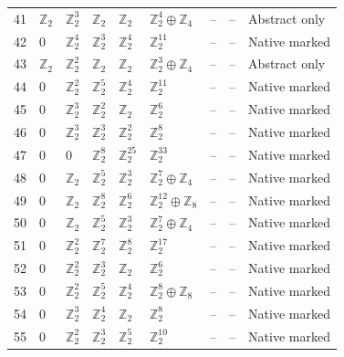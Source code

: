 \documentclass[10pt]{article}
\begin{document}
\begin{longtable}{r|lllll|rrl}
41 & $\mathbb{Z}_{2}$ & $\mathbb{Z}_{2}^{3}$ & $\mathbb{Z}_{2}$ & $\mathbb{Z}_{2}$ & $\mathbb{Z}_{2}^{4}\oplus \mathbb{Z}_{4}$ & -- & -- & Abstract only\\
42 & $0$ & $\mathbb{Z}_{2}^{4}$ & $\mathbb{Z}_{2}^{3}$ & $\mathbb{Z}_{2}^{4}$ & $\mathbb{Z}_{2}^{11}$ & -- & -- & Native marked\\
43 & $\mathbb{Z}_{2}$ & $\mathbb{Z}_{2}^{2}$ & $\mathbb{Z}_{2}$ & $\mathbb{Z}_{2}$ & $\mathbb{Z}_{2}^{3}\oplus \mathbb{Z}_{4}$ & -- & -- & Abstract only\\
44 & $0$ & $\mathbb{Z}_{2}^{2}$ & $\mathbb{Z}_{2}^{5}$ & $\mathbb{Z}_{2}^{4}$ & $\mathbb{Z}_{2}^{11}$ & -- & -- & Native marked\\
45 & $0$ & $\mathbb{Z}_{2}^{3}$ & $\mathbb{Z}_{2}^{2}$ & $\mathbb{Z}_{2}$ & $\mathbb{Z}_{2}^{6}$ & -- & -- & Native marked\\
46 & $0$ & $\mathbb{Z}_{2}^{3}$ & $\mathbb{Z}_{2}^{3}$ & $\mathbb{Z}_{2}^{2}$ & $\mathbb{Z}_{2}^{8}$ & -- & -- & Native marked\\
47 & $0$ & $0$ & $\mathbb{Z}_{2}^{8}$ & $\mathbb{Z}_{2}^{25}$ & $\mathbb{Z}_{2}^{33}$ & -- & -- & Native marked\\
48 & $0$ & $\mathbb{Z}_{2}$ & $\mathbb{Z}_{2}^{5}$ & $\mathbb{Z}_{2}^{3}$ & $\mathbb{Z}_{2}^{7}\oplus \mathbb{Z}_{4}$ & -- & -- & Native marked\\
49 & $0$ & $\mathbb{Z}_{2}$ & $\mathbb{Z}_{2}^{8}$ & $\mathbb{Z}_{2}^{6}$ & $\mathbb{Z}_{2}^{12}\oplus \mathbb{Z}_{8}$ & -- & -- & Native marked\\
50 & $0$ & $\mathbb{Z}_{2}$ & $\mathbb{Z}_{2}^{5}$ & $\mathbb{Z}_{2}^{3}$ & $\mathbb{Z}_{2}^{7}\oplus \mathbb{Z}_{4}$ & -- & -- & Native marked\\
51 & $0$ & $\mathbb{Z}_{2}^{2}$ & $\mathbb{Z}_{2}^{7}$ & $\mathbb{Z}_{2}^{8}$ & $\mathbb{Z}_{2}^{17}$ & -- & -- & Native marked\\
52 & $0$ & $\mathbb{Z}_{2}^{2}$ & $\mathbb{Z}_{2}^{3}$ & $\mathbb{Z}_{2}$ & $\mathbb{Z}_{2}^{6}$ & -- & -- & Native marked\\
53 & $0$ & $\mathbb{Z}_{2}^{2}$ & $\mathbb{Z}_{2}^{5}$ & $\mathbb{Z}_{2}^{4}$ & $\mathbb{Z}_{2}^{8}\oplus \mathbb{Z}_{8}$ & -- & -- & Native marked\\
54 & $0$ & $\mathbb{Z}_{2}^{3}$ & $\mathbb{Z}_{2}^{4}$ & $\mathbb{Z}_{2}$ & $\mathbb{Z}_{2}^{8}$ & -- & -- & Native marked\\
55 & $0$ & $\mathbb{Z}_{2}^{2}$ & $\mathbb{Z}_{2}^{3}$ & $\mathbb{Z}_{2}^{5}$ & $\mathbb{Z}_{2}^{10}$ & -- & -- & Native marked\\

\end{longtable}
\end{document}
